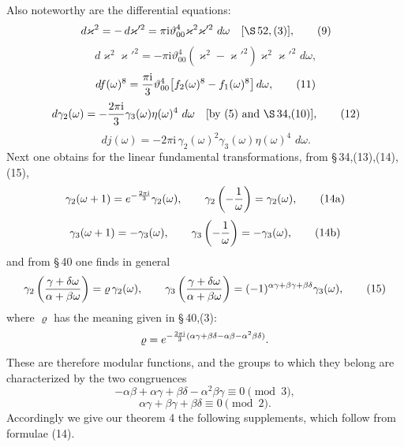 \documentclass[11pt]{article}
\providecommand{\dd}{\,d}
\providecommand{\tht}{\vartheta}
\providecommand{\ii}{\mathrm{i}}
\begin{document}
Also noteworthy are the differential equations:
\begin{equation}
\dd\varkappa^2=-\dd\varkappa'^2=\pi\ii\tht_{00}^4\varkappa^2\varkappa'^2\,\dd\omega
\quad[\S\,52,(3)],
\tag{9}
\end{equation}
\begin{equation}
\dd\varkappa^2\varkappa'^2=-\pi\ii\tht_{00}^4(\varkappa^2-\varkappa'^2)\varkappa^2\varkappa'^2\,\dd\omega,
\tag{10}
\end{equation}
\begin{equation}
\dd f(\omega)^8={\pi\ii\over3}\tht_{00}^4\bigl[f_2(\omega)^8-f_1(\omega)^8\bigr] \dd\omega,
\tag{11}
\end{equation}
\begin{equation}
\dd\gamma_2(\omega)=-{2\pi\ii\over3}\gamma_3(\omega)\eta(\omega)^4\,\dd\omega
\quad\text{[by (5) and \S\,34,(10)]},
\tag{12}
\end{equation}
\begin{equation}
\dd j(\omega)=-2\pi\ii\,\gamma_2(\omega)^2\gamma_3(\omega)\eta(\omega)^4\,\dd\omega.
\tag{13}
\end{equation}
Next one obtains for the linear fundamental transformations, from \S\,34,(13),(14),(15),
\begin{equation}
\gamma_2(\omega+1)=e^{-{2\pi\ii\over3}}\gamma_2(\omega),
\qquad
\gamma_2\left(-{1\over\omega}\right)=\gamma_2(\omega),
\tag{14a}
\end{equation}
\begin{equation}
\gamma_3(\omega+1)=-\gamma_3(\omega),
\qquad
\gamma_3\left(-{1\over\omega}\right)=-\gamma_3(\omega),
\tag{14b}
\end{equation}
and from \S\,40 one finds in general
\begin{equation}
\gamma_2\left({\gamma+\delta\omega\over\alpha+\beta\omega}\right)=\varrho\,\gamma_2(\omega),
\qquad
\gamma_3\left({\gamma+\delta\omega\over\alpha+\beta\omega}\right)=(-1)^{\alpha\gamma+\beta\gamma+\beta\delta}\gamma_3(\omega),
\tag{15}
\end{equation}
where $\varrho$ has the meaning given in \S\,40,(3):
\[
\varrho=e^{-{2\pi\ii\over3}(\alpha\gamma+\beta\delta-\alpha\beta-\alpha^2\beta\delta)}.
\]
These are therefore modular functions, and the groups to which they belong are characterized by the two congruences
\[
-\alpha\beta+\alpha\gamma+\beta\delta-\alpha^2\beta\gamma\equiv0\pmod3,
\]
\[
\alpha\gamma+\beta\gamma+\beta\delta\equiv0\pmod2.
\]
Accordingly we give our theorem 4 the following supplements, which follow from formulae (14).
\end{document}
